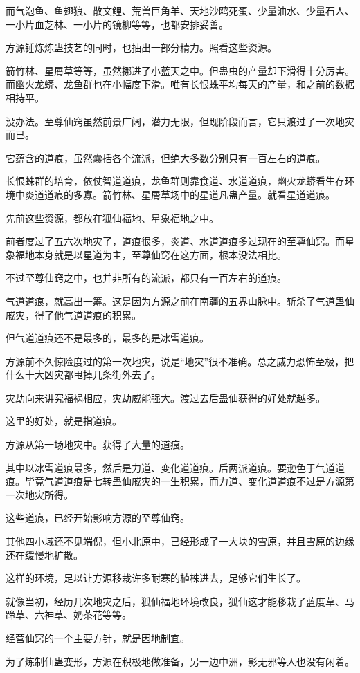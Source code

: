 \begin{this_body}
而气泡鱼、鱼翅狼、散文鲤、荒兽巨角羊、天地沙鸥死蛋、少量油水、少量石人、一小片血芝林、一小片的镜柳等等，也都安排妥善。

方源锤炼炼蛊技艺的同时，也抽出一部分精力。照看这些资源。

箭竹林、星屑草等等，虽然挪进了小蓝天之中。但蛊虫的产量却下滑得十分厉害。而幽火龙蟒、龙鱼群也在小幅度下滑。唯有长恨蛛平均每天的产量，和之前的数据相持平。

没办法。至尊仙窍虽然前景广阔，潜力无限，但现阶段而言，它只渡过了一次地灾而已。

它蕴含的道痕，虽然囊括各个流派，但绝大多数分别只有一百左右的道痕。

长恨蛛群的培育，依仗智道道痕，龙鱼群则靠食道、水道道痕，幽火龙蟒看生存环境中炎道道痕的多寡。箭竹林、星屑草场中的星道凡蛊产量。就看星道道痕。

先前这些资源，都放在狐仙福地、星象福地之中。

前者度过了五六次地灾了，道痕很多，炎道、水道道痕多过现在的至尊仙窍。而星象福地本身就是以星道为主，至尊仙窍在这方面，根本没法相比。

不过至尊仙窍之中，也并非所有的流派，都只有一百左右的道痕。

气道道痕，就高出一筹。这是因为方源之前在南疆的五界山脉中。斩杀了气道蛊仙戚灾，得了他气道道痕的积累。

但气道道痕还不是最多的，最多的是冰雪道痕。

方源前不久惊险度过的第一次地灾，说是“地灾”很不准确。总之威力恐怖至极，把什么十大凶灾都甩掉几条街外去了。

灾劫向来讲究福祸相应，灾劫威能强大。渡过去后蛊仙获得的好处就越多。

这里的好处，就是指道痕。

方源从第一场地灾中。获得了大量的道痕。

其中以冰雪道痕最多，然后是力道、变化道道痕。后两派道痕。要逊色于气道道痕。毕竟气道道痕是七转蛊仙戚灾的一生积累，而力道、变化道道痕不过是方源第一次地灾所得。

这些道痕，已经开始影响方源的至尊仙窍。

其他四小域还不见端倪，但小北原中，已经形成了一大块的雪原，并且雪原的边缘还在缓慢地扩散。

这样的环境，足以让方源移栽许多耐寒的植株进去，足够它们生长了。

就像当初，经历几次地灾之后，狐仙福地环境改良，狐仙这才能移栽了蓝度草、马蹄草、六神草、奶茶花等等。

经营仙窍的一个主要方针，就是因地制宜。

为了炼制仙蛊变形，方源在积极地做准备，另一边中洲，影无邪等人也没有闲着。


\end{this_body}
